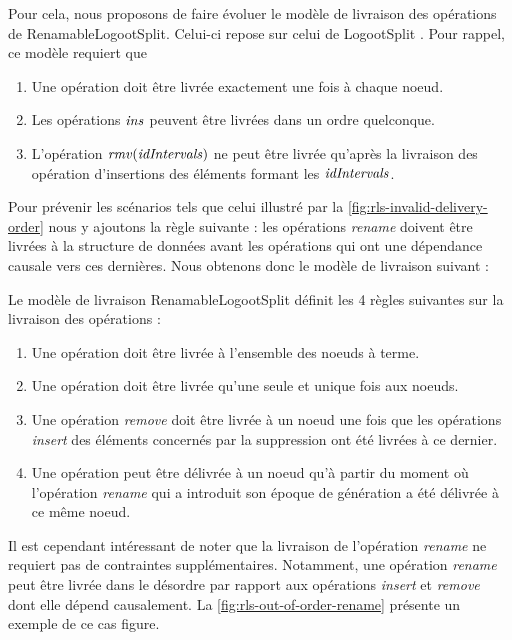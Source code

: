 Pour cela, nous proposons de faire évoluer le modèle de livraison des opérations de RenamableLogootSplit.
Celui-ci repose sur celui de LogootSplit .
Pour rappel, ce modèle requiert que
\begin{enumerate}
  \item Une opération doit être livrée exactement une fois à chaque noeud.
  \item Les opérations $\mathit{ins}$ peuvent être livrées dans un ordre quelconque.
  \item L'opération $\mathit{rmv}(\mathit{idIntervals})$ ne peut être livrée qu'après la livraison des opération d'insertions des éléments formant les $\mathit{idIntervals}$.
\end{enumerate}

Pour prévenir les scénarios tels que celui illustré par la \autoref{fig:rls-invalid-delivery-order} nous y ajoutons la règle suivante : les opérations \emph{rename} doivent être livrées à la structure de données avant les opérations qui ont une dépendance causale vers ces dernières.
Nous obtenons donc le modèle de livraison suivant :

\begin{definition}
  \label{def:rls-delivery-model}
  Le modèle de livraison RenamableLogootSplit définit les 4 règles suivantes sur la livraison des opérations :
  \begin{enumerate}
    \item Une opération doit être livrée à l'ensemble des noeuds à terme.
    \item Une opération doit être livrée qu'une seule et unique fois aux noeuds.
    \item Une opération \emph{remove} doit être livrée à un noeud une fois que les opérations \emph{insert} des éléments concernés par la suppression ont été livrées à ce dernier.
    \item Une opération peut être délivrée à un noeud qu'à partir du moment où l'opération \emph{rename} qui a introduit son époque de génération a été délivrée à ce même noeud.
  \end{enumerate}
\end{definition}

Il est cependant intéressant de noter que la livraison de l'opération \emph{rename} ne requiert pas de contraintes supplémentaires.
Notamment, une opération \emph{rename} peut être livrée dans le désordre par rapport aux opérations \emph{insert} et \emph{remove} dont elle dépend causalement.
La \autoref{fig:rls-out-of-order-rename} présente un exemple de ce cas figure.

